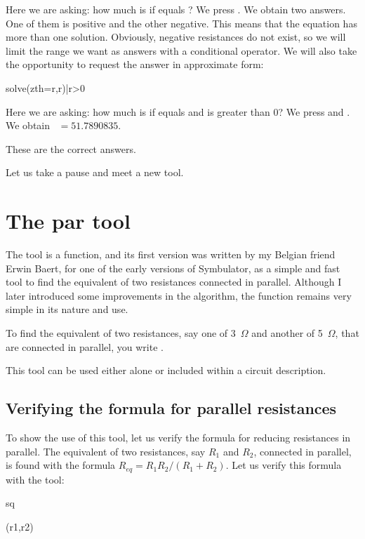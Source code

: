 Here we are asking: how much is  if  equals
? We press . We obtain two answers. One of them
is positive and the other negative. This means that the equation has
more than one solution. Obviously, negative resistances do not
exist, so we will limit the range we want as answers with a
conditional operator. We will also take the opportunity to request
the answer in approximate form:

\begin{entry}
solve(zth=r,r)|r>0
\end{entry}

Here we are asking: how much is  if  equals
 and  is greater than 0? We press \key{$\diamond$}
and . We obtain ~$= 51.7890835$.

These are the correct answers.

Let us take a pause and meet a new tool.

\section{The par tool}

The  tool is a function, and its first version was written
by my Belgian friend Erwin Baert, for one of the early versions of
Symbulator, as a simple and fast tool to find the equivalent of two
resistances connected in parallel. Although I later introduced some
improvements in the algorithm, the function remains very simple in
its nature and use.

To find the equivalent of two resistances, say one of 3~$\Omega$ and
another of 5~$\Omega$, that are connected in parallel, you write
.

This tool can be used either alone or included within a circuit
description.

\subsection{Verifying the formula for parallel resistances}

To show the use of this tool, let us verify the formula for reducing
resistances in parallel. The equivalent of two resistances, say
$R_1$ and $R_2$, connected in parallel, is found with the formula
$R_{eq} = R_1 R_2/(R_1 + R_2)$. Let us verify this formula with the
 tool:

\begin{entry}
sq\par(r1,r2)
\end{entry}

